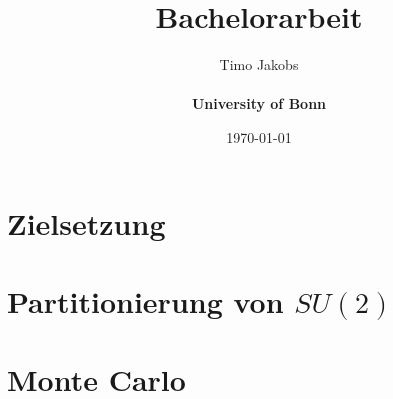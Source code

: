 \documentclass[a4paper]{scrartcl}
\title{Bachelorarbeit}
\author{Timo Jakobs \\\\ \textbf{University of Bonn}}
\date{\today}
\begin{document}
\maketitle
\tableofcontents
\newpage

\section{Zielsetzung}

\section{Partitionierung von $SU(2)$}


\newpage
\section{Monte Carlo}

\end{document}
